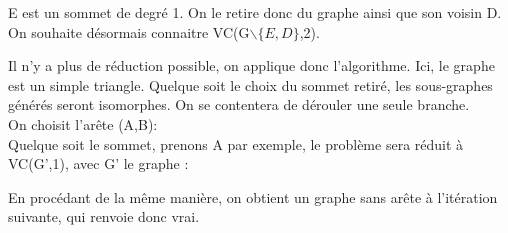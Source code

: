 \documentclass[]{article}
\begin{document}
\begin{enumerate}
\begin{enumerate}
\begin{enumerate}
\begin{center}
\end{center}
\vspace*{7mm}
E est un sommet de degré 1. On le retire donc du graphe ainsi que son voisin D. On souhaite désormais connaitre VC(G$\backslash\{E,D\}$,2).\\
\begin{center}
\end{center}
\vspace*{7mm}
Il n'y a plus de réduction possible, on applique donc l'algorithme. Ici, le graphe est un simple triangle. Quelque soit le choix du sommet retiré, les sous-graphes générés seront isomorphes. On se contentera de dérouler une seule branche.\\
On choisit l'arête (A,B):\\
Quelque soit le sommet, prenons A par exemple, le problème sera réduit à VC(G',1), avec G' le graphe :\\
\begin{center}
\end{center}
\vspace*{7mm}
En procédant de la même manière, on obtient un graphe sans arête à l'itération suivante, qui renvoie donc vrai.\\
\end{enumerate}


\end{enumerate}
\end{enumerate}
\end{document}
